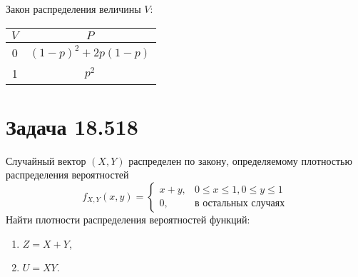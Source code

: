 Закон распределения величины $V$:

\begin{tabular}{|c|c|}
    \hline
    $V$ & $P$                   \\
    \hline
    0   & $(1-p)^2 + 2 p (1-p)$ \\
    \hline
    1   & $p^2$                 \\
    \hline
\end{tabular}


\section*{Задача 18.518}

Случайный вектор $\left ( X, Y \right )$ распределен по закону, определяемому плотностью распределения вероятностей
$$
f_{X, Y} ( x, y )
= \left \{
\begin{array}{ll}
    x + y, & 0 \le x \le 1, 0 \le y \le 1 \\
    0,     & \text{в остальных случаях}
\end{array}
\right .
$$
Найти плотности распределения вероятностей функций:
\begin{enumerate}
    \item $Z = X + Y$,
    \item $U = XY$.
\end{enumerate}

